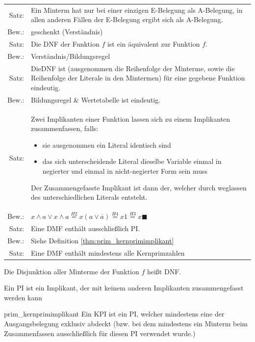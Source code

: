 \documentclass[10pt,a4paper]{scrartcl}
\begin{document}
\begin{table}[h!]
	\centering
	\begin{tabular}{rp{15cm}}
	Satz: & Ein Minterm hat nur bei einer einzigen E-Belegung \glqq 1\grqq{} als A-Belegung, in allen anderen Fällen der E-Belegung ergibt sich \glqq 0\grqq{} als A-Belegung.\\
	Bew.:& geschenkt (Verständnis)\\ \hline
	Satz: & Die \ac{DNF} der Funktion $ f $ ist ein äquivalent zur Funktion $ f $.\\
	Bew.:& Verständnis/Bildungsregel\\ \hline
	Satz: & Die\ac{DNF} ist (ausgenommen die Reihenfolge der Minterme, sowie die Reihenfolge der Literale in den Mintermen) für eine gegebene Funktion eindeutig.\\
	Bew.:& Bildungsregel \& Wertetabelle ist eindeutig.\\ \hline
	Satz: & Zwei Implikanten einer Funktion lassen sich zu einem Implikanten zusammenfassen, falls:
	\begin{itemize}[itemsep=0mm]
		\item sie ausgenommen ein Literal identisch sind
		\item das sich unterscheidende Literal dieselbe Variable einmal in negierter und einmal in nicht-negierter Form sein muss
	\end{itemize}
	Der Zusammengefasste Implikant ist dann der, welcher durch weglassen des unterschiedlichen Literals entsteht. \\
	Bew.:&$ x \wedge a \vee x \wedge a \overset{H2}{=} x(a \vee \overline{a}) \overset{H4}{=} x1 \overset{H3}{=} x \blacksquare$\\ \hline
	Satz: & Eine \ac{DMF} enthält ausschließlich \ac{PI}.\\
	Bew.:&  Siehe Definition \ref{thm:prim_kernprimimplikant} \\ \hline
	Satz: & Eine \ac{DMF} enthält mindestens alle Kernprimzahlen
\end{tabular}
\end{table}

\begin{Theorem}{}{}
	Die Disjunktion aller Minterme der Funktion $ f $ heißt \ac{DNF}.
\end{Theorem}
\begin{Theorem}{}{}
Ein \ac{PI} ist ein Implikant, der mit keinem anderen Implikanten zusammengefasst werden kann
\end{Theorem}
\begin{Theorem}{}{prim_kernprimimplikant}
	Ein \ac{KPI} ist ein \ac{PI}, welcher mindestens eine der Ausgangsbelegung exklusiv abdeckt (bzw. bei dem mindestens ein Minterm beim Zusammenfassen ausschließlich für diesen \ac{PI} verwendet wurde.)
\end{Theorem}
\end{document}
